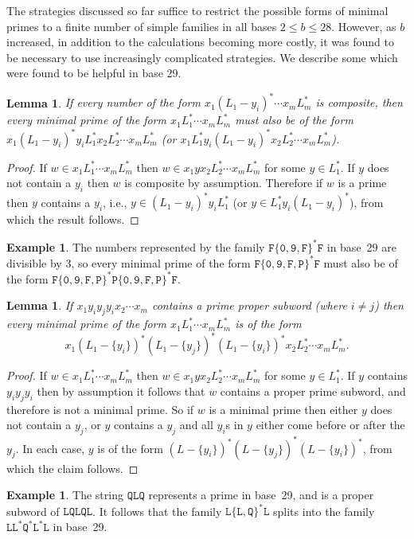 \documentclass[12pt]{article}
\theoremstyle{plain}
\newtheorem{lemma}[theorem]{Lemma}
\theoremstyle{definition}
\newtheorem{example}[theorem]{Example}
\theoremstyle{remark}
\newcommand{\0}{\mathtt{0}}
\newcommand{\1}{\mathtt{1}}
\newcommand{\2}{\mathtt{2}}
\newcommand{\3}{\mathtt{3}}
\newcommand{\4}{\mathtt{4}}
\newcommand{\5}{\mathtt{5}}
\newcommand{\6}{\mathtt{6}}
\newcommand{\7}{\mathtt{7}}
\newcommand{\8}{\mathtt{8}}
\newcommand{\9}{\mathtt{9}}
\begin{document}
The strategies discussed so far suffice to restrict the possible forms of minimal primes to a finite number of simple families in all bases $2\leq b\leq 28$.
However, as $b$ increased, in addition to the calculations becoming more costly, 
it was found to be necessary to use increasingly complicated strategies.  
We describe some which were found to be helpful in base 29.
\begin{lemma}
If every number of the form $x_1(L_1-y_i)^*\dotsm x_mL_m^*$ is composite, then
every minimal prime of the form $x_1L_1^*\dotsm x_mL_m^*$ must also be of the form
$x_1(L_1-y_i)^*y_iL_1^*x_2L_2^*\dotsm x_mL_m^*$ (or $x_1L_1^*y_i(L_1-y_i)^*x_2L_2^*\dotsm x_mL_m^*$).  %
\end{lemma}
\begin{proof}
If $w\in x_1L_1^*\dotsm x_mL_m^*$ then $w\in x_1yx_2L_2^*\dotsm x_mL_m^*$ for some $y\in L_1^*$.  If $y$ does not contain a $y_i$
then $w$ is composite by assumption.  Therefore if $w$ is a prime then $y$ contains a $y_i$, i.e., $y\in( L_1-y_i)^*y_iL_1^*$ (or $y\in L_1^*y_i(L_1-y_i)^*$), %
from which the
result follows.
\end{proof}
\begin{example}
The numbers represented by the family $\mathtt{F}\{\0,\9,\mathtt{F}\}^*\mathtt{F}$ in base~29 are divisible by $3$,
so every minimal prime of the form $\mathtt{F}\{\0,\9,\mathtt{F},\mathtt{P}\}^*\mathtt{F}$ must also be of the form
$\mathtt{F}\{\0,\9,\mathtt{F},\mathtt{P}\}^*\mathtt{P}\{\0,\9,\mathtt{F},\mathtt{P}\}^*\mathtt{F}$.
\end{example}
\begin{lemma}
If $x_1y_iy_jy_ix_2\dotsm x_m$ contains a prime proper subword (where $i\neq j$) then every minimal prime of the form
$x_1L_1^*\dotsm x_mL_m^*$ is of the form \[x_1(L_1-\{y_i\})^*(L_1-\{y_j\})^*(L_1-\{y_i\})^*x_2L_2^*\dotsm x_mL_m^* . \]
\end{lemma}
\begin{proof}
If $w\in x_1L_1^*\dotsm x_mL_m^*$ then $w\in x_1yx_2L_2^*\dotsm x_mL_m^*$ for some $y\in L_1^*$.
If $y$ contains $y_iy_jy_i$ then by assumption it follows that $w$ contains a proper prime subword,
and therefore is not a minimal prime.  So if $w$ is a minimal prime then either $y$ does not contain
a $y_j$, or $y$ contains a $y_j$ and all $y_i$s in $y$ either come before or after the $y_j$.
In each case, $y$ is of the form $(L-\{y_i\})^*(L-\{y_j\})^*(L-\{y_i\})^*$, from which the claim follows.
\end{proof}
\begin{example}
The string $\mathtt{QLQ}$ represents a prime in base~29, and is a proper subword of $\mathtt{LQLQL}$.
It follows that the family $\mathtt{L}\{\mathtt{L},\mathtt{Q}\}^*\mathtt{L}$ splits into the family $\mathtt{L}\mathtt{L}^*\mathtt{Q}^*\mathtt{L}^*\mathtt{L}$ in base~29.
\end{example}
\end{document}
